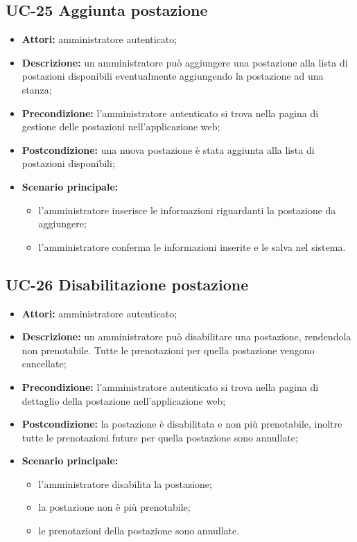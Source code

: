 \subsection{UC-25 Aggiunta postazione}
\begin{itemize}
    \item \textbf{Attori:} amministratore autenticato;
    \item \textbf{Descrizione:} un amministratore pu\`{o} aggiungere una postazione alla lista di postazioni disponibili eventualmente aggiungendo la postazione ad una stanza;
    \item \textbf{Precondizione:} l'amministratore autenticato si trova nella pagina di gestione delle postazioni nell'applicazione web;
    \item \textbf{Postcondizione:} una nuova postazione \`{e} stata aggiunta alla lista di postazioni disponibili;
    \item \textbf{Scenario principale:}
    \begin{itemize}
        \item l'amministratore inserisce le informazioni riguardanti la postazione da aggiungere;
        \item l'amministratore conferma le informazioni inserite e le salva nel sistema.
    \end{itemize}
\end{itemize}


\subsection{UC-26 Disabilitazione postazione}
\begin{itemize}
    \item \textbf{Attori:} amministratore autenticato;
    \item \textbf{Descrizione:} un amministratore pu\`{o} disabilitare una postazione, rendendola non prenotabile. Tutte le prenotazioni per quella postazione vengono cancellate;
    \item \textbf{Precondizione:} l'amministratore autenticato si trova nella pagina di dettaglio della postazione nell'applicazione web;
    \item \textbf{Postcondizione:} la postazione \`{e} disabilitata e non pi\`{u} prenotabile, inoltre tutte le prenotazioni future per quella postazione sono annullate;
    \item \textbf{Scenario principale:}
    \begin{itemize}
        \item l'amministratore disabilita la postazione;
        \item la postazione non \`{e} più prenotabile;
        \item le prenotazioni della postazione sono annullate.
    \end{itemize}
\end{itemize}


